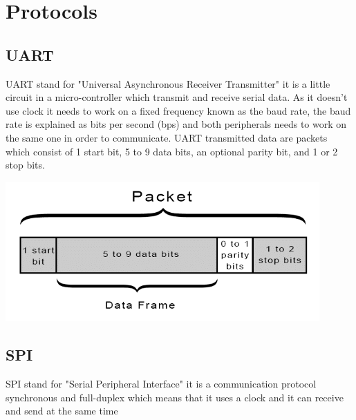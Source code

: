 \documentclass[12pt,a4paper,landscape]{article}
\begin{document}
\section*{Protocols}
	\begin{multicols}{2}
		\subsection*{UART}
		UART stand for "Universal Asynchronous Receiver Transmitter" it is a little circuit in a micro-controller which transmit and receive serial data.
		As it doesn't use clock it needs to work on a fixed frequency known as the baud rate, the baud rate is explained as bits per second (bps) and both peripherals needs to work on the same one in order to communicate.
		UART transmitted data are packets which consist of 1 start bit, 5 to 9 data bits, an optional parity bit, and 1 or 2 stop bits.

		\begin{center}
			\includegraphics[width=12cm]{UART_packet.png}
		\end{center}

		\vspace{4cm}

		\subsection*{SPI}
		SPI stand for "Serial Peripheral Interface" it is a communication protocol synchronous and full-duplex which means that it uses a clock and it can receive and send at the same time\\


\end{multicols}
\end{document}
